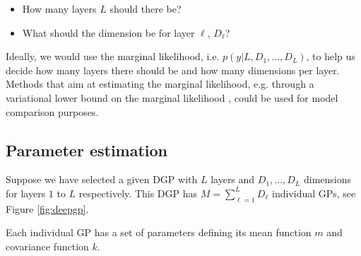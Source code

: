 \documentclass{article}
\newcommand{\1}{\mathbbm{1}}
\begin{document}
\begin{itemize}
\item How many layers $L$ should there be?
\item What should the dimension be for layer $\ell$, $D_\ell$?
\end{itemize}
Ideally, we would use the marginal likelihood, 
i.e. $p(y|L,D_1,\ldots,D_L)$, to help us decide how many layers there should be
and how many dimensions per layer.
Methods that aim at estimating the marginal likelihood,
e.g. through a variational lower bound on the marginal likelihood \citep{damianou2013deep},
could be used for model comparison purposes.

\subsection{Parameter estimation}

Suppose we have selected a given DGP with $L$ layers and $D_1,\ldots,D_L$ 
dimensions for layers $1$ to $L$ respectively.
This DGP has $M=\sum_{\ell=1}^L D_\ell$ individual GPs, 
see Figure \ref{fig:deepgp}.

Each individual GP has a set of parameters defining its mean function $m$ and 
covariance function $k$. 



\end{document}
